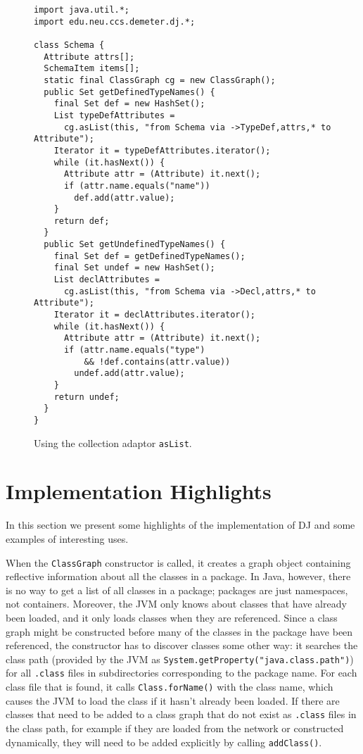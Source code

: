\documentclass{llncs}
\newcommand{\code}[1]{\texttt{#1}}
\begin{document}
\begin{figure}[tbhp!]
\begin{minipage}{\textwidth}
\begin{verbatim}
import java.util.*;
import edu.neu.ccs.demeter.dj.*;

class Schema {
  Attribute attrs[];
  SchemaItem items[];
  static final ClassGraph cg = new ClassGraph();
  public Set getDefinedTypeNames() {
    final Set def = new HashSet();
    List typeDefAttributes =
      cg.asList(this, "from Schema via ->TypeDef,attrs,* to Attribute");
    Iterator it = typeDefAttributes.iterator();
    while (it.hasNext()) {
      Attribute attr = (Attribute) it.next();
      if (attr.name.equals("name"))
        def.add(attr.value);
    }
    return def;
  }
  public Set getUndefinedTypeNames() {
    final Set def = getDefinedTypeNames();
    final Set undef = new HashSet();
    List declAttributes = 
      cg.asList(this, "from Schema via ->Decl,attrs,* to Attribute");
    Iterator it = declAttributes.iterator();
    while (it.hasNext()) {
      Attribute attr = (Attribute) it.next();
      if (attr.name.equals("type")
          && !def.contains(attr.value))
        undef.add(attr.value);
    }
    return undef;
  }
}
\end{verbatim}
\end{minipage}
\caption{Using the collection adaptor \code{asList}.}
\label{fig:asList}
\end{figure}

\section{Implementation Highlights}

In this section we present some highlights of the implementation of DJ
and some examples of interesting uses.

When the \code{ClassGraph} constructor is called, it creates a graph
object containing reflective information about all the classes in a
package.  In Java, however, there is no way to get a list of all
classes in a package; packages are just namespaces, not containers.
Moreover, the JVM only knows about classes that have already been
loaded, and it only loads classes when they are referenced.  Since a
class graph might be constructed before many of the classes in
the package have been referenced, the constructor has to discover
classes some other way: it searches the class path (provided by the
JVM as \code{System.getProperty("java.class.path")}) for all
\code{.class} files in subdirectories corresponding to the package
name.  For each class file that is found, it calls
\code{Class.forName()} with the class name, which causes the JVM to
load the class if it hasn't already been loaded.  If there are
classes that need to be added to a class graph that do not exist
as \code{.class} files in the class path, for example if they are
loaded from the network or constructed dynamically, they will need to
be added explicitly by calling \code{addClass()}.
\end{document}
